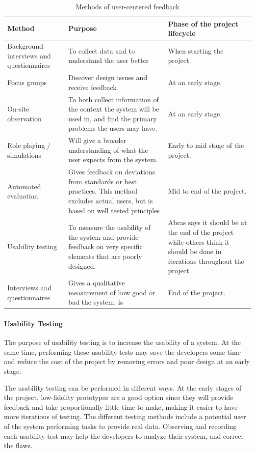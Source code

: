 \begin{table}[H]
\begin{tabular}{|p{5cm} | p{5cm} | p{5cm} |}
\hline
\textbf{Method} & \textbf{Purpose} & \textbf{Phase of the project lifecycle} \\ \hline
Background interviews and questionnaires & To collect data and to understand the user better & When starting the project. \\ \hline
Focus groups & Discover design issues and receive feedback & At an early stage. \\ \hline
On-site observation & To both collect information of the context the system will be used in, and find the primary problems the users may have. & At an early stage. \\ \hline
Role playing / simulations & Will give a broader understanding of what the user expects from the system. & Early to mid stage of the project. \\ \hline
Automated evaluation & Gives feedback on deviations from standards or best practices. This method excludes actual users, but is based on well tested principles & Mid to end of the project. \\ \hline
Usability testing & To measure the usability of the system and provide feedback on very specific elements that are poorly designed. & Abras\cite{abrasusercentereddesign} says it should be at the end of the project while others\cite{schneidermanusercentered} think it should be done in iterations throughout the project. \\ \hline
Interviews and questionnaires & Gives a qualitative measurement of how good or bad the system. is & End of the project. \\ \hline
\end{tabular}
\caption{Methods of user-centered feedback}
\label{table:designduringlifecycle}
\end{table}


\paragraph{Usability Testing}
The purpose of usability testing is to increase the usability of a system. At the same time, performing these usability tests may save the developers some time and reduce the cost of the project by removing errors and poor design at an early stage\cite{dumas1995practical}.

The usability testing can be performed in different ways\cite{schneidermanusercentered}. At the early stages of the project, low-fidelity prototypes are a good option since they will provide feedback and take proportionally little time to make, making it easier to have more iterations of testing. The different testing methods include a potential user of the system performing tasks to provide real data. Observing and recording each usability test may help the developers to analyze their system, and correct the flaws\cite{dumas1995practical}. 

